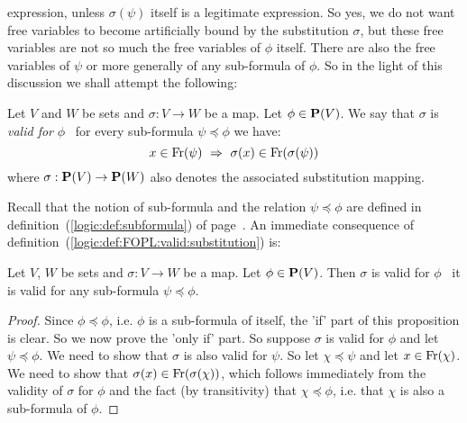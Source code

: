 expression, unless $\sigma(\psi)$ itself is a legitimate expression.
So yes, we do not want free variables to become artificially bound
by the substitution $\sigma$, but these free variables are not so
much the free variables of $\phi$ itself. There are also the free
variables of $\psi$ or more generally of any sub-formula of $\phi$.
So in the light of this discussion we shall attempt the following:
\begin{defin}\label{logic:def:FOPL:valid:substitution}
    Let $V$ and $W$ be sets and $\sigma:V\to W$ be a map. Let
    $\phi\in\mbox{${\bf P}(V)$}$. We say that $\sigma$ is {\em valid for} $\phi$ \ifand\
    for every sub-formula $\psi\preceq\phi$ we have:
    \[
        x\in\free(\psi)\ \Rightarrow\ \sigma(x)\in\free(\sigma(\psi))
    \]
    where $\sigma:\mbox{${\bf P}(V)$}\to{\bf P}(W)$ also denotes the associated substitution 
    mapping.
\end{defin}
Recall that the notion of sub-formula and the relation
$\psi\preceq\phi$ are defined in
definition~(\ref{logic:def:subformula}) of
page~\pageref{logic:def:subformula}. An immediate consequence of
definition~(\ref{logic:def:FOPL:valid:substitution}) is:
\begin{prop}\label{logic:prop:FOPL:valid:subformula}
    Let $V$, $W$ be sets and $\sigma:V\to W$ be a map. Let $\phi\in\mbox{${\bf P}(V)$}$. 
    Then $\sigma$ is valid for $\phi$ \ifand\ it is valid for any sub-formula 
    $\psi\preceq\phi$.
\end{prop}
\begin{proof}
Since $\phi\preceq\phi$, i.e. $\phi$ is a sub-formula of itself, the
'if' part of this proposition is clear. So we now prove the 'only
if' part. So suppose $\sigma$ is valid for $\phi$ and let
$\psi\preceq\phi$. We need to show that $\sigma$ is also valid for
$\psi$. So let $\chi\preceq\psi$ and let $x\in\mbox{\rm Fr}(\chi)$. We need
to show that $\sigma(x)\in\mbox{\rm Fr}(\sigma(\chi))$, which follows
immediately from the validity of $\sigma$ for $\phi$ and the fact
(by transitivity) that $\chi\preceq\phi$, i.e. that $\chi$ is also a
sub-formula of $\phi$.
\end{proof}

